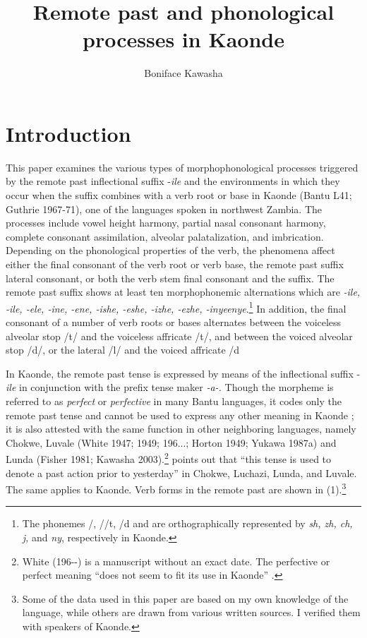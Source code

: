 \documentclass[output=paper]{langsci/langscibook}
\title{Remote past and phonological processes in Kaonde}
\author{%
Boniface Kawasha\affiliation{Savannah State University}
}
\begin{document}

\section{Introduction}

This paper examines the various types of morphophonological processes triggered by the remote past inflectional suffix -\emph{ile} and the environments in which they occur when the suffix combines with a verb root or base in Kaonde (Bantu L41; Guthrie 1967-71), one of the languages spoken in northwest Zambia. The processes include vowel height harmony, partial nasal consonant harmony, complete consonant assimilation, alveolar palatalization, and imbrication. Depending on the phonological properties of the verb, the phenomena affect either the final consonant of the verb root or verb base, the remote past suffix lateral consonant, or both the verb stem final consonant and the suffix. The remote past suffix shows at least ten morphophonemic alternations which are \emph{{}-ile, -ile, -ele, -ine, -ene, -ishe, -eshe, -izhe, -ezhe, -inye}\emph{enye}.\footnote{The phonemes /, //t, /d and \textstyleipa{/}\href{http://en.wikipedia.org/wiki/Ɲ}{}\textstyleipa{/} are orthographically represented by \textit{sh, zh, ch, j,} and \textit{ny}, respectively in Kaonde.} 
In addition, the final consonant of a number of verb roots or bases alternates between the voiceless alveolar stop /t/ and the voiceless affricate /t/, and between the voiced alveolar stop /d/, or the lateral /l/ and the voiced affricate /d


In Kaonde, the remote past tense is expressed by means of the inflectional suffix -\emph{ile} in conjunction with the prefix tense maker \emph{{}-a-}\textit{.} Though the morpheme is referred to as \emph{perfect} or \emph{perfective} in many Bantu languages, it codes only the remote past tense and cannot be used to express any other meaning in Kaonde \citep[137]{Wright1977}; it is also attested with the same function in other neighboring languages, namely Chokwe, Luvale (White 1947; 1949; 196...; Horton 1949; Yukawa 1987a) and Lunda (Fisher 1981; Kawasha 2003).\footnote{ White (196-{}-) is a manuscript without an exact date. The perfective or perfect meaning “does not seem to fit its use in Kaonde” \citep{Wright1997}.} \citet[6]{White1947} points out that “this tense is used to denote a past action prior to yesterday” in Chokwe, Luchazi, Lunda, and Luvale. The same applies to Kaonde. Verb forms in the remote past are shown in (1).\footnote{ Some of the data used in this paper are based on my own knowledge of the language, while others are drawn from various written sources. I verified them with speakers of Kaonde.}
\end{document}
